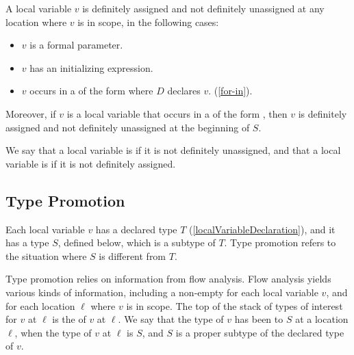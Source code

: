 \documentclass[makeidx]{article}
\begin{document}
\LMHash{}%
A local variable $v$ is definitely assigned and not definitely unassigned
at any location where $v$ is in scope,
in the following cases:

\begin{itemize}
\item $v$ is a formal parameter.
\item $v$ has an initializing expression.
\item $v$ occurs in a  of the form
   where $D$ declares $v$.
  (\ref{for-in}).
\end{itemize}

\LMHash{}%
Moreover, if $v$ is a local variable that occurs in
a  of the form
,
then $v$ is definitely assigned and not definitely unassigned
at the beginning of $S$.

\LMHash{}%
We say that a local variable is
if it is not definitely unassigned,
and that a local variable is
if it is not definitely assigned.


\subsection{Type Promotion}

\LMHash{}%
Each local variable $v$ has a declared type $T$
(\ref{localVariableDeclaration}),
and it has a type $S$, defined below, which is a subtype of $T$.
Type promotion refers to the situation where $S$ is different from $T$.


\LMHash{}%
Type promotion relies on information from flow analysis.
Flow analysis yields various kinds of information,
including a non-empty
for each local variable $v$,
and for each location $\ell$ where $v$ is in scope.
The top of the stack of types of interest for $v$ at $\ell$ is the
of $v$ at $\ell$.
We say that the type of $v$ has been
to $S$ at a location $\ell$,
when the type of $v$ at $\ell$ is $S$,
and $S$ is a proper subtype of the declared type of $v$.
\end{document}
